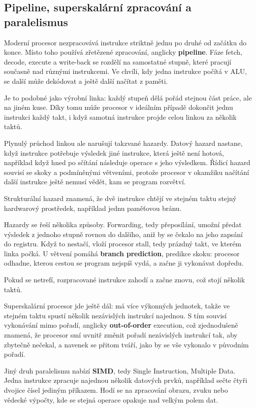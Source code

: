 \subsection*{Pipeline, superskalární zpracování a paralelismus}

Moderní procesor nezpracovává instrukce striktně jednu po druhé od začátku do konce. Místo toho používá zřetězené zpracování, anglicky \textbf{pipeline}. Fáze fetch, decode, execute a write-back se rozdělí na samostatné stupně, které pracují současně nad různými instrukcemi. Ve chvíli, kdy jedna instrukce počítá v ALU, se další může dekódovat a ještě další načítat z paměti.

Je to podobné jako výrobní linka: každý stupeň dělá pořád stejnou část práce, ale na jiném kuse. Díky tomu může procesor v ideálním případě dokončit jednu instrukci každý takt, i když samotná instrukce projde celou linkou za několik taktů.

Plynulý průchod linkou ale narušují takzvané hazardy. Datový hazard nastane, když instrukce potřebuje výsledek jiné instrukce, která ještě není hotová, například když hned po sčítání následuje operace s jeho výsledkem. Řídicí hazard souvisí se skoky a podmíněnými větveními, protože procesor v okamžiku načítání další instrukce ještě nemusí vědět, kam se program rozvětví.

Strukturální hazard znamená, že dvě instrukce chtějí ve stejném taktu stejný hardwarový prostředek, například jednu paměťovou bránu.

Hazardy se řeší několika způsoby. Forwarding, tedy přeposílání, umožní předat výsledek z jednoho stupně rovnou do dalšího, aniž by se čekalo na jeho zapsání do registru. Když to nestačí, vloží procesor stall, tedy prázdný takt, ve kterém linka počká. U větvení pomáhá \textbf{branch prediction}, predikce skoku: procesor odhadne, kterou cestou se program nejspíš vydá, a začne ji vykonávat dopředu.

Pokud se netrefí, rozpracované instrukce zahodí a začne znovu, což stojí několik taktů.

Superskalární procesor jde ještě dál: má více výkonných jednotek, takže ve stejném taktu spustí několik nezávislých instrukcí najednou. S tím souvisí vykonávání mimo pořadí, anglicky \textbf{out-of-order} execution, což zjednodušeně znamená, že procesor smí uvnitř změnit pořadí nezávislých instrukcí tak, aby zbytečně nečekal, a navenek se přitom tváří, jako by se vše vykonalo v původním pořadí.

Jiný druh paralelismu nabízí \textbf{SIMD}, tedy Single Instruction, Multiple Data. Jedna instrukce zpracuje najednou několik datových prvků, například sečte čtyři dvojice čísel jediným příkazem. Hodí se na zpracování obrazu, zvuku nebo vědecké výpočty, kde se stejná operace opakuje nad velkým polem dat.

